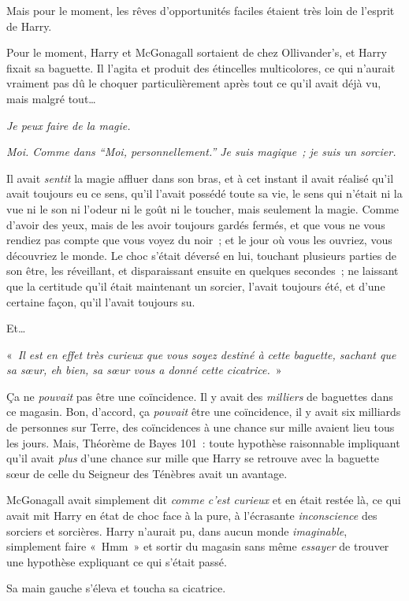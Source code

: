 Mais pour le moment, les rêves d'opportunités faciles étaient très loin de l'esprit de Harry.

Pour le moment, Harry et McGonagall sortaient de chez Ollivander's, et Harry fixait sa baguette. Il l'agita et produit des étincelles multicolores, ce qui n'aurait vraiment pas dû le choquer particulièrement après tout ce qu'il avait déjà vu, mais malgré tout…

\emph{Je peux faire de la magie.}

\emph{Moi. Comme dans “Moi, personnellement.” Je suis magique~; je suis un sorcier.}

Il avait \emph{sentit} la magie affluer dans son bras, et à cet instant il avait réalisé qu'il avait toujours eu ce sens, qu'il l'avait possédé toute sa vie, le sens qui n'était ni la vue ni le son ni l'odeur ni le goût ni le toucher, mais seulement la magie. Comme d'avoir des yeux, mais de les avoir toujours gardés fermés, et que vous ne vous rendiez pas compte que vous voyez du noir~; et le jour où vous les ouvriez, vous découvriez le monde. Le choc s'était déversé en lui, touchant plusieurs parties de son être, les réveillant, et disparaissant ensuite en quelques secondes~; ne laissant que la certitude qu'il était maintenant un sorcier, l'avait toujours été, et d'une certaine façon, qu'il l'avait toujours su.

Et…

«~\emph{Il est en effet très curieux que vous soyez destiné à cette baguette, sachant que sa sœur, eh bien, sa sœur vous a donné cette cicatrice.}~»

Ça ne \emph{pouvait} pas être une coïncidence. Il y avait des \emph{milliers} de baguettes dans ce magasin. Bon, d'accord, ça \emph{pouvait} être une coïncidence, il y avait six milliards de personnes sur Terre, des coïncidences à une chance sur mille avaient lieu tous les jours. Mais, Théorème de Bayes 101~: toute hypothèse raisonnable impliquant qu'il avait \emph{plus} d'une chance sur mille que Harry se retrouve avec la baguette sœur de celle du Seigneur des Ténèbres avait un avantage.

McGonagall avait simplement dit \emph{comme c'est curieux} et en était restée là, ce qui avait mit Harry en état de choc face à la pure, à l'écrasante \emph{inconscience} des sorciers et sorcières. Harry n'aurait pu, dans aucun monde \emph{imaginable}, simplement faire «~Hmm~» et sortir du magasin sans même \emph{essayer} de trouver une hypothèse expliquant ce qui s'était passé.

Sa main gauche s'éleva et toucha sa cicatrice.

